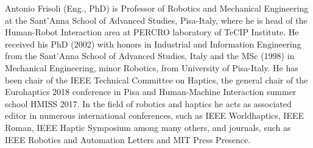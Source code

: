 \begin{IEEEbiography}{Antonio Frisoli} (Eng., PhD) is Professor of Robotics and Mechanical Engineering at the Sant'Anna School of Advanced Studies, Pisa-Italy, where he is head of the Human-Robot Interaction area at PERCRO laboratory of TeCIP Institute. He received his PhD (2002) with honors in Industrial and Information Engineering from the Sant'Anna School of Advanced Studies, Italy and the MSc (1998) in Mechanical Engineering, minor Robotics, from University of Pisa-Italy.  He has been chair of the IEEE Technical Committee on Haptics, the general chair of the Eurohaptics 2018 conference in Pisa and Human-Machine Interaction summer school HMISS 2017. In the field of robotics and haptics he acts as associated editor in numerous international conferences, such as IEEE Worldhaptics, IEEE Roman, IEEE Haptic Symposium among many others, and journals, such as IEEE Robotics and Automation Letters and MIT Press Presence.


\end{IEEEbiography}